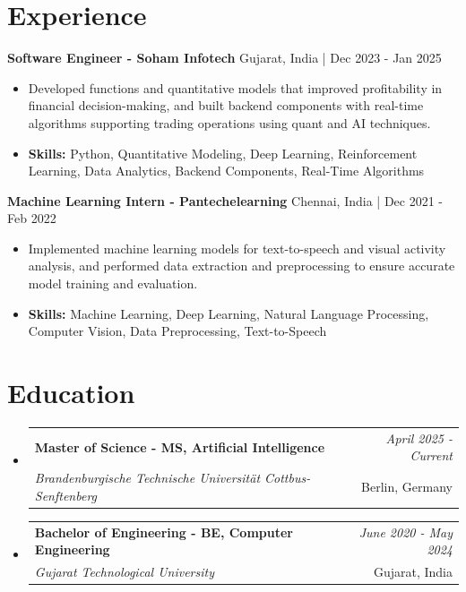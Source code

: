 \documentclass[a4paper,11pt]{article}
\makeatletter
\newcommand{\resumeSubheading}[4]{
\vspace{0.5mm}\item
    \begin{tabular*}{\linewidth}[t]{l@{\extracolsep{\fill}}r}
        \textbf{#1} & \textit{\footnotesize{#4}} \\
        \textit{\footnotesize{#3}} &  \footnotesize{#2}\\
    \end{tabular*}
    \vspace{-2.4mm}
}
\makeatother
\begin{document}
\section{\textbf{Experience}}


\vspace{1mm}
  \textbf{Software Engineer - Soham Infotech} \hfill Gujarat, India | Dec 2023 - Jan 2025
\vspace{-1.5mm} %
\begin{itemize}
  \item Developed functions and quantitative models that improved profitability in financial decision-making, and built backend components with real-time algorithms supporting trading operations using quant and AI techniques.

\vspace{-2mm}
  \item \textbf{Skills:} Python, Quantitative Modeling, Deep Learning, Reinforcement Learning, Data Analytics, Backend Components, Real-Time Algorithms
\end{itemize}

\vspace{1mm}
  \textbf{Machine Learning Intern - Pantechelearning} \hfill Chennai, India | Dec 2021 - Feb 2022
\vspace{-1.5mm} %
\begin{itemize}
  \item Implemented machine learning models for text-to-speech and visual activity analysis, and performed data extraction and preprocessing to ensure accurate model training and evaluation.
\vspace{-2mm}
  \item \textbf{Skills:} Machine Learning, Deep Learning, Natural Language Processing, Computer Vision, Data Preprocessing, Text-to-Speech
\end{itemize}\section{\textbf{Education}}
\vspace{-0.4mm}

\begin{itemize}[leftmargin=0.15in, label={}]
\resumeSubheading
{Master of Science - MS, Artificial Intelligence }{Berlin, Germany}
{Brandenburgische Technische Universität Cottbus-Senftenberg  }{April 2025 - Current}

\vspace{1.0mm} %
\resumeSubheading
{Bachelor of Engineering - BE, Computer Engineering  }{Gujarat, India}
{Gujarat Technological University }{June 2020 - May 2024}

\end{itemize}
\end{document}
